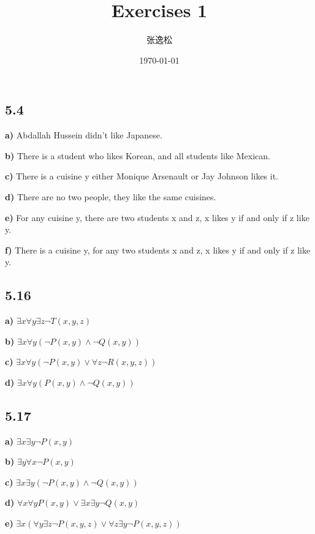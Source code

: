 \documentclass[10pt]{ctexart}
\title{Exercises 1}
\author{张逸松}
\date{\today}
\begin{document}
    \maketitle
    \subsection*{5.4}
        \textbf{a)} Abdallah Hussein didn't like Japanese. \par
        \textbf{b)} There is a student who likes Korean, and all students like Mexican. \par
        \textbf{c)} There is a cuisine y either Monique Arsenault or Jay Johnson likes it. \par
        \textbf{d)} There are no two people, they like the same cuisines. \par
        \textbf{e)} For any cuisine y, there are two students x and z, x likes y if and only if z like y. \par
        \textbf{f)} There is a cuisine y, for any two students x and z, x likes y if and only if z like y.

    \subsection*{5.16}
        \textbf{a)} $\exists x \forall y \exists z \neg T(x, y, z)$ \par
        \textbf{b)} $\exists x \forall y (\neg P(x, y) \wedge \neg Q(x, y))$ \par
        \textbf{c)} $\exists x \forall y (\neg P(x, y) \vee \forall z \neg R(x, y, z))$ \par
        \textbf{d)} $\exists x \forall y (P(x, y) \wedge \neg Q(x, y))$

    \subsection*{5.17}
        \textbf{a)} $\exists x \exists y \neg P(x, y)$ \par
        \textbf{b)} $\exists y \forall x \neg P(x, y)$ \par
        \textbf{c)} $\exists x \exists y (\neg P(x, y) \wedge \neg Q(x, y))$ \par
        \textbf{d)} $\forall x \forall y P(x, y) \vee \exists x \exists y \neg Q(x, y)$ \par 
        \textbf{e)} $\exists x (\forall y \exists z \neg P(x, y, z) \vee \forall z \exists y \neg P(x, y, z))$ \par
\end{document}
